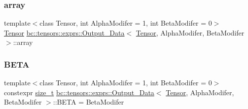 \mbox{\label{structbc_1_1tensors_1_1exprs_1_1Output__Data_ab5d07d4d17f739b0dc4b63ab87921bb7}} 
\subsubsection{\texorpdfstring{array}{array}}
{\footnotesize\ttfamily template$<$class Tensor, int Alpha\+Modifer = 1, int Beta\+Modifer = 0$>$ \\
\hyperlink{namespacebc_a659391e47ab612be3ba6c18cf9c89159}{Tensor} \hyperlink{structbc_1_1tensors_1_1exprs_1_1Output__Data}{bc\+::tensors\+::exprs\+::\+Output\+\_\+\+Data}$<$ \hyperlink{namespacebc_a659391e47ab612be3ba6c18cf9c89159}{Tensor}, Alpha\+Modifer, Beta\+Modifer $>$\+::array}

\mbox{\label{structbc_1_1tensors_1_1exprs_1_1Output__Data_a0de394d92d40090e01a31039ae473791}} 
\subsubsection{\texorpdfstring{B\+E\+TA}{BETA}}
{\footnotesize\ttfamily template$<$class Tensor, int Alpha\+Modifer = 1, int Beta\+Modifer = 0$>$ \\
constexpr \hyperlink{namespacebc_aaf8e3fbf99b04b1b57c4f80c6f55d3c5}{size\+\_\+t} \hyperlink{structbc_1_1tensors_1_1exprs_1_1Output__Data}{bc\+::tensors\+::exprs\+::\+Output\+\_\+\+Data}$<$ \hyperlink{namespacebc_a659391e47ab612be3ba6c18cf9c89159}{Tensor}, Alpha\+Modifer, Beta\+Modifer $>$\+::B\+E\+TA = Beta\+Modifer\hspace{0.3cm}{\ttfamily [static]}}

\mbox{\label{structbc_1_1tensors_1_1exprs_1_1Output__Data_a94a1df11454a60c39b2cefd6e22f4077}} 
